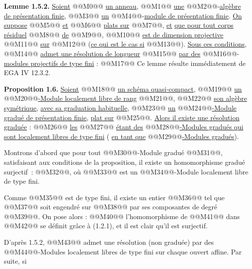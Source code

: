 
\textbf{Lemme 1.5.2.} \uline{Soient} @@M0@@ \uline{un anneau}, @@M1@@ \uline{une} @@M2@@-\uline{algèbre de présentation finie}, @@M3@@ \uline{un} @@M4@@-\uline{module de présentation finie}. \uline{On suppose} @@M5@@ \uline{et} @@M6@@ \uline{plats sur} @@M7@@, \uline{et} \uline{que pour tout corps résiduel} @@M8@@ \uline{de} @@M9@@, @@M10@@ \uline{est de dimension projective} @@M11@@ \uline{sur} @@M12@@ (\uline{ce qui est le cas si} @@M13@@). \uline{Sous ces conditions}, @@M14@@ \uline{admet une résolution de longueur} @@M15@@ \uline{par des} @@M16@@-\uline{modules projectifs de type fini} :
@@M17@@
Ce lemme résulte immédiatement de EGA IV 12.3.2.

\textbf{Proposition 1.6.} \uline{Soient} @@M18@@ \uline{un schéma quasi-compact}, @@M19@@ \uline{un} @@M20@@\uline{-Module localement libre de rang} @@M21@@, @@M22@@ \uline{son algèbre symétrique}, \uline{avec sa graduation habituelle}, @@M23@@ \uline{un} @@M24@@\uline{-Module gradué de présentation finie}, \uline{plat sur} @@M25@@. \uline{Alors il existe une résolution graduée} :
@@M26@@
\uline{les} @@M27@@ \uline{étant des} @@M28@@\uline{-Modules gradués qui sont localement libres de type fini} ( \uline{en tant que} @@M29@@\uline{-Modules gradués}).

Montrons d'abord que pour tout @@M30@@-Module gradué @@M31@@, satisfaisant aux conditions de la proposition, il existe un homomorphisme gradué surjectif~: @@M32@@, où @@M33@@ est un @@M34@@-Module localement libre de type fini.

Comme @@M35@@ est de type fini, il existe un entier @@M36@@ tel que @@M37@@ soit engendré sur @@M38@@ par ses composantes de degré @@M39@@. On pose alors :
@@M40@@
l'homomorphisme de @@M41@@ dans @@M42@@ se définit grâce à (1.2.1), et il est clair qu'il est surjectif.

D'après 1.5.2, @@M43@@ admet une résolution (non graduée) par des @@M44@@-Modules localement libres de type fini sur chaque ouvert affine. Par suite, si 
